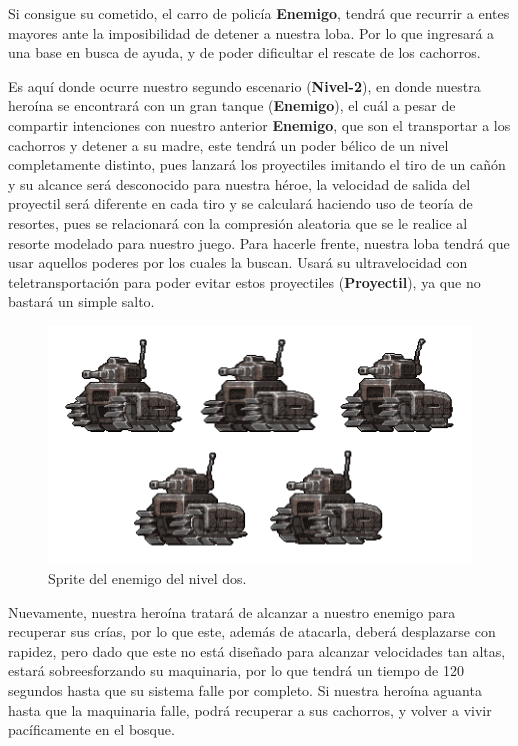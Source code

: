 \documentclass{article}
\begin{document}
Si consigue su cometido, el carro de policía \textbf{Enemigo}, tendrá que recurrir a entes mayores ante la imposibilidad de detener a nuestra loba. Por lo que ingresará a una base en busca de ayuda, y de poder dificultar el rescate de los cachorros. 

\vspace{5mm}

Es aquí donde ocurre nuestro segundo escenario (\textbf{Nivel-2}), en donde nuestra heroína se encontrará con un gran tanque (\textbf{Enemigo}), el cuál a pesar de compartir intenciones con nuestro anterior \textbf{Enemigo}, que son el transportar a los cachorros y detener a su madre, este tendrá un poder bélico de un nivel completamente distinto, pues lanzará los proyectiles imitando el tiro de un cañón y su alcance será desconocido para nuestra héroe, la velocidad de salida del proyectil será diferente en cada tiro y se calculará haciendo uso de teoría de resortes, pues se relacionará con la compresión aleatoria que se le realice al resorte modelado para nuestro juego. Para hacerle frente, nuestra loba tendrá que usar aquellos poderes por los cuales la buscan. Usará su ultravelocidad con teletransportación para poder evitar estos proyectiles (\textbf{Proyectil}), ya que no bastará un simple salto.

\newpage
\begin{figure}[h]
\includegraphics[scale=0.7]{Images/spritetanque.png}
\centering
\caption{Sprite del enemigo del nivel dos.}
\label{fig:spriteproy}
\end{figure}

Nuevamente, nuestra heroína tratará de alcanzar a nuestro enemigo para recuperar sus crías, por lo que este, además de atacarla, deberá desplazarse con rapidez, pero dado que este no está diseñado para alcanzar velocidades tan altas, estará sobreesforzando su maquinaria, por lo que tendrá un tiempo de 120 segundos hasta que su sistema falle por completo. Si nuestra heroína aguanta hasta que la maquinaria falle, podrá recuperar a sus cachorros, y volver a vivir pacíficamente en el bosque.
\end{document}

